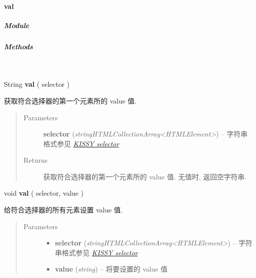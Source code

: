 \documentclass[letterpaper,10pt,english]{sphinxmanual}
\begin{document}
\paragraph{val}
\label{api/core/dom/val::doc}\label{api/core/dom/val:val}

\subparagraph{Module}
\label{api/core/dom/val:module}\begin{quote}

{\hyperref[api/core/dom/index:module-DOM]{}}
\end{quote}


\subparagraph{Methods}
\label{api/core/dom/val:methods}

\begin{fulllineitems}
\label{api/core/dom/val:DOM.val}~
\begin{DUlineblock}{0em}
\item[] String \textbf{val} ( selector )
\item[] 获取符合选择器的第一个元素所的 value 值.
\end{DUlineblock}
\begin{quote}\begin{description}
\item[{Parameters}] \leavevmode
\textbf{selector} (\emph{string\textbar{}HTMLCollection\textbar{}Array\textless{}HTMLElement\textgreater{}}) -- 字符串格式参见 {\hyperref[api/core/dom/selector:dom-selector]{\emph{KISSY selector}}}

\item[{Returns}] \leavevmode
获取符合选择器的第一个元素所的 value 值. 无值时, 返回空字符串.

\end{description}\end{quote}

\begin{DUlineblock}{0em}
\item[] void \textbf{val} ( selector, value )
\item[] 给符合选择器的所有元素设置 value 值.
\end{DUlineblock}
\begin{quote}\begin{description}
\item[{Parameters}] \leavevmode\begin{itemize}
\item {}
\textbf{selector} (\emph{string\textbar{}HTMLCollection\textbar{}Array\textless{}HTMLElement\textgreater{}}) -- 字符串格式参见 {\hyperref[api/core/dom/selector:dom-selector]{\emph{KISSY selector}}}

\item {}
\textbf{value} (\emph{string}) -- 将要设置的 value 值

\end{itemize}

\end{description}\end{quote}

\end{fulllineitems}
\end{document}
